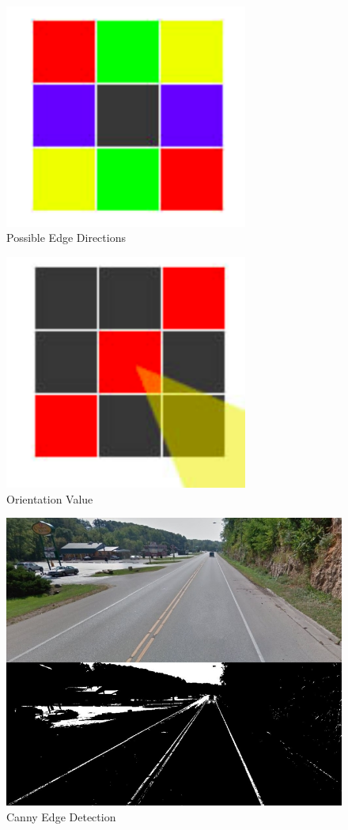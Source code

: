 \documentclass[12pt]{report}
\begin{document}
\newpage
\vspace{0.5cm}
\begin{figure}[ht!]
	\centering
	\includegraphics[width=8cm]{directions}
	\caption{Possible Edge Directions}
	\label{fig:directions}
\end{figure}

\newpage
\vspace{0.5cm}
\begin{figure}[ht!]
	\centering
	\includegraphics[width=8cm]{orientation}
	\caption{Orientation Value}
	\label{fig:orientation}
\end{figure}

\vspace{0.5cm}
\begin{figure}[ht!]
	\centering
	\includegraphics[width=12cm]{canny}
	\caption{Canny Edge Detection}
	\label{fig:canny}
\end{figure}
\end{document}
